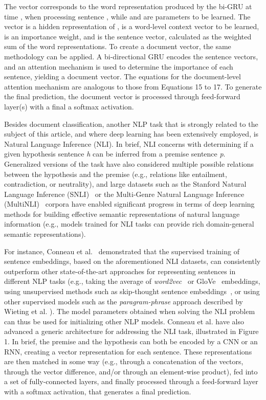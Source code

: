 The vector  corresponds to the word representation produced by the bi-GRU at time , when processing sentence , while  and  are parameters to be learned. The vector  is a hidden representation of ,   is a word-level context vector to be learned,  is an importance weight, and  is the sentence vector, calculated as the weighted sum of the word representations. To create a document vector, the same methodology can be applied. A bi-directional GRU encodes the sentence vectors, and an attention mechanism is used to determine the importance of each sentence, yielding a document vector. The equations for the document-level attention mechanism are analogous to those from Equations 15 to 17. To generate the final prediction, the document vector is processed through feed-forward layer(s) with a final a softmax activation.

Besides document classification, another NLP task that is strongly related to the subject of this article, and where deep learning has been extensively employed, is Natural Language Inference (NLI). In brief, NLI concerns with determining if a given  hypothesis sentence \textit{h} can be inferred from a premise sentence \textit{p}. Generalized versions of the task have also considered multiple possible relations between the hypothesis and the premise (e.g., relations like entailment, contradiction, or neutrality), and large datasets such as the Stanford Natural Language Inference (SNLI)~\cite{snli} or the 
Multi-Genre Natural Language Inference (MultiNLI)~\cite{inference} corpora have enabled significant progress in terms of deep learning methods for building effective semantic representations of natural language information (e.g., models trained for NLI tasks can provide rich domain-general semantic representations).

For instance, Conneau et al.~\cite{supervised} demonstrated that the supervised training of sentence embeddings, based on the aforementioned NLI datasets, can consistently outperform other state-of-the-art approaches for representing sentences in different NLP tasks (e.g., taking the average of \textit{word2vec}~\cite{word2vec} or GloVe~\cite{glove} embeddings, using unsupervised methods such as skip-thought sentence embeddings~\cite{skip}, or using other supervised models such as the \textit{paragram-phrase} approach described by Wieting et al. \cite{paragram}). The model parameters obtained when solving the NLI problem can thus be used for initializing other NLP models. Conneau et al. have also advanced a generic architecture for addressing the NLI task, illustrated in Figure 1. In brief, the premise and the hypothesis can both be encoded by a CNN or an RNN, creating a vector representation for each sentence. These representations are then matched in some way (e.g., through a concatenation of the vectors, through the vector difference, and/or through an element-wise product), fed into a set of fully-connected layers, and finally processed through a feed-forward layer with a softmax activation, that generates a final prediction.

